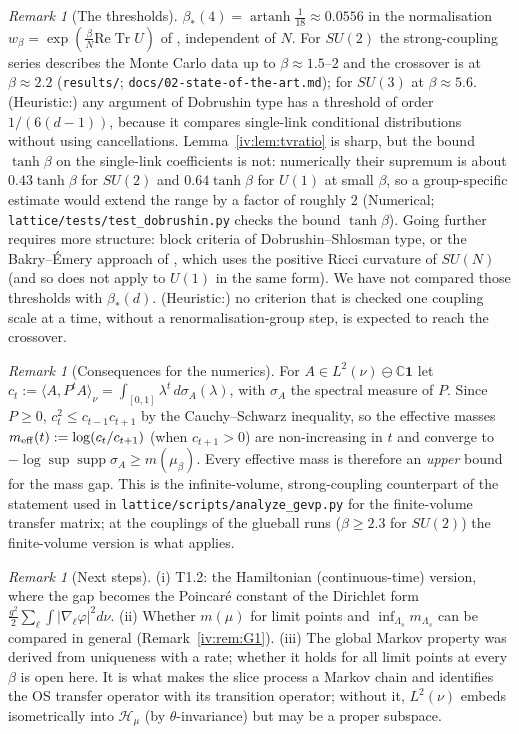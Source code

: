 \documentclass[11pt,a4paper]{article}
\theoremstyle{definition}
\theoremstyle{remark}
\newtheorem{remark}[theorem]{Remark}
\DeclareMathOperator{\Tr}{Tr}
\DeclareMathOperator{\supp}{supp}
\DeclareMathOperator{\artanh}{artanh}
\newcommand{\C}{\mathbb{C}}
\newcommand{\cH}{\mathcal{H}}
\newcommand{\ip}[2]{\langle #1,#2\rangle}
\newcommand{\bS}{\beta_*}
\begin{document}
\begin{remark}[The thresholds]
$\bS(4)=\artanh\frac1{18}\approx0.0556$ in the normalisation $w_\beta=\exp(\frac\beta N\mathrm{Re}\Tr U)$ of \cite{F}, independent of $N$.
For $SU(2)$ the strong-coupling series describes the Monte Carlo data up to $\beta\approx1.5$--$2$ and the crossover is at
$\beta\approx2.2$ (\texttt{results/}; \texttt{docs/02-state-of-the-art.md}); for $SU(3)$ at $\beta\approx5.6$. (Heuristic:) any argument of
Dobrushin type has a threshold of order $1/(6(d-1))$, because it compares single-link conditional distributions without using
cancellations. Lemma~\ref{iv:lem:tvratio} is sharp, but the bound $\tanh\beta$ on the single-link coefficients is not: numerically their
supremum is about $0.43\tanh\beta$ for $SU(2)$ and $0.64\tanh\beta$ for $U(1)$ at small $\beta$, so a group-specific estimate would
extend the range by a factor of roughly $2$ (Numerical; \texttt{lattice/tests/test\_dobrushin.py} checks the bound $\tanh\beta$). Going further requires more structure: block criteria of Dobrushin--Shlosman type, or the Bakry--\'Emery
approach of \cite{SZZ23}, which uses the positive Ricci curvature of $SU(N)$ (and so does not apply to $U(1)$ in the same form). We
have not compared those thresholds with $\bS(d)$. (Heuristic:) no criterion that is checked one coupling scale at a time, without
a renormalisation-group step, is expected to reach the crossover.
\end{remark}

\begin{remark}[Consequences for the numerics]\label{iv:rem:numerics}
For $A\in L^2(\nu)\ominus\C\mathbf 1$ let $c_t:=\ip A{P^tA}_\nu=\int_{[0,1]}\lambda^t\,d\sigma_A(\lambda)$, with $\sigma_A$ the spectral measure
of $P$. Since $P\ge0$, $c_t^2\le c_{t-1}c_{t+1}$ by the Cauchy--Schwarz inequality, so the effective masses
$m_{\rm eff}(t):=\log(c_t/c_{t+1})$ (when $c_{t+1}>0$) are non-increasing in $t$ and converge to $-\log\sup\supp\sigma_A\ge m(\mu_\beta)$.
Every effective mass is therefore an \emph{upper} bound for the mass gap. This is the infinite-volume, strong-coupling counterpart of
the statement used in \texttt{lattice/scripts/analyze\_gevp.py} for the finite-volume transfer matrix; at the couplings of the
glueball runs ($\beta\ge2.3$ for $SU(2)$) the finite-volume version is what applies.
\end{remark}

\begin{remark}[Next steps]
(i) T1.2: the Hamiltonian (continuous-time) version, where the gap becomes the Poincar\'e constant of the Dirichlet form
$\frac{g^2}2\sum_\ell\int|\nabla_\ell\varphi|^2d\nu$. (ii) Whether $m(\mu)$ for limit points and $\inf_{\Lambda_s}m_{\Lambda_s}$ can be
compared in general (Remark~\ref{iv:rem:G1}). (iii) The global Markov property was derived from uniqueness with a rate; whether it holds
for all limit points at every $\beta$ is open here. It is what makes the slice process a Markov chain and identifies the OS transfer
operator with its transition operator; without it, $L^2(\nu)$ embeds isometrically into $\cH_\mu$ (by $\theta$-invariance) but may be a
proper subspace.
\end{remark}
\end{document}
